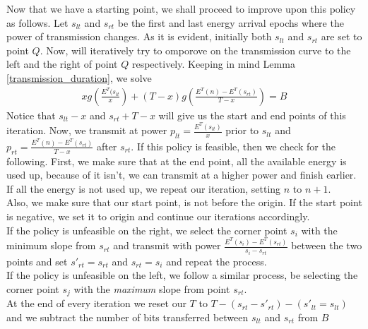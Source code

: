 Now that we have a starting point, we shall proceed to improve upon this policy as follows. Let $s_{lt}$ and $s_{rt}$ be the first and last energy arrival epochs where the power of transmission changes. 
As it is evident, initially both $s_{lt}$ and $s_{rt}$ are set to point $Q$. Now, will iteratively try to omporove on the transmission curve to the left and the right of point $Q$ respectively. 
Keeping in mind Lemma \ref{transmission_duration}, we solve 
\begin{align}
xg(\frac{E^T(s_{lt}}{x}) + (T-x)g(\frac{E^T(n)-E^T(s_{rt})}{T-x}) = B
\end{align}
Notice that $s_{lt} - x$ and $s_{rt} + T-x$ will give us the start and end points of this iteration. Now, we transmit at power $p_{lt} = \frac{E^T(s_{lt})}{x}$ prior to $s_{lt}$ and $p_{rt} = \frac{E^T(n) - E^T(s_{rt})}{T-x}$ after $s_{rt}$. 
If this policy is feasible, then we check for the following. First, we make sure that at the end point, all the available energy is used up, because of it isn't, we can transmit at a higher power and finish earlier. 
If all the energy is not used up, we repeat our iteration, setting $n$ to $n+1$. \\
Also, we make sure that our start point, is not before the origin. If the start point is negative, we set it to origin and continue our iterations accordingly.\\

If the policy is unfeasible on the right, we select the corner point $s_i$ with the minimum slope from $s_{rt}$ and transmit with power $\frac{E^T(s_i) - E^T(s_{rt})}{s_i-s_{rt}}$ between the two points and set $s'_{rt} = s_{rt}$ and $s_{rt} = s_i$ and repeat the process.\\
If the policy is unfeasible on the left, we follow a similar process, be selecting the corner point $s_j$ with the \textit{maximum} slope from point $s_{rt}$.\\
At the end of every iteration we reset our $T$ to $ T - (s_{rt} - s'_{rt}) - (s'_{lt} = s_{lt})$ and we subtract the number of bits transferred between $s_{lt}$ and $s_{rt}$ from $B$



